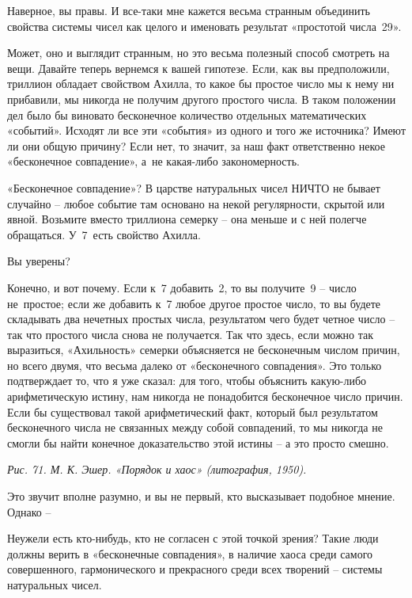 \documentclass[../main.tex]{subfiles}
\begin{document}
\begin{dialogue}
 Наверное, вы правы. И все-таки мне кажется весьма странным объединить свойства системы чисел как целого и именовать результат «простотой числа~29».

 Может, оно и выглядит странным, но это весьма полезный способ смотреть на вещи. Давайте теперь вернемся к вашей гипотезе. Если, как вы предположили, триллион обладает свойством Ахилла, то какое бы простое число мы к нему ни прибавили, мы никогда не получим другого простого числа. В таком положении дел было бы виновато бесконечное количество отдельных математических «событий». Исходят ли все эти «события» из одного и того же источника? Имеют ли они общую причину? Если нет, то значит, за наш факт ответственно некое «бесконечное совпадение», а~не какая-либо закономерность.

 «Бесконечное совпадение»? В царстве натуральных чисел НИЧТО не бывает случайно \--- любое событие там основано на некой регулярности, скрытой или явной. Возьмите вместо триллиона семерку \--- она меньше и с ней полегче обращаться. У~7~есть свойство Ахилла.

 Вы уверены?

 Конечно, и вот почему. Если к~7 добавить~2, то вы получите~9 \--- число не~простое; если же добавить к~7 любое другое простое число, то вы будете складывать два нечетных простых числа, результатом чего будет четное число \--- так что простого числа снова не получается. Так что здесь, если можно так выразиться, «Ахильность» семерки объясняется не бесконечным числом причин, но всего двумя, что весьма далеко от «бесконечного совпадения». Это только подтверждает то, что я уже сказал: для того, чтобы объяснить какую-либо арифметическую истину, нам никогда не понадобится бесконечное число причин. Если бы существовал такой арифметический факт, который был результатом бесконечного числа не связанных между собой совпадений, то мы никогда не смогли бы найти конечное доказательство этой истины \--- а это просто смешно.

\emph{Рис. 71. М. К. Эшер. «Порядок и хаос» (литография, 1950).}

 Это звучит вполне разумно, и вы не первый, кто высказывает подобное мнение. Однако \---

 Неужели есть кто-нибудь, кто не согласен с этой точкой зрения? Такие люди должны верить в «бесконечные совпадения», в наличие хаоса среди самого совершенного, гармонического и прекрасного среди всех творений \--- системы натуральных чисел.


\end{dialogue}
\end{document}
